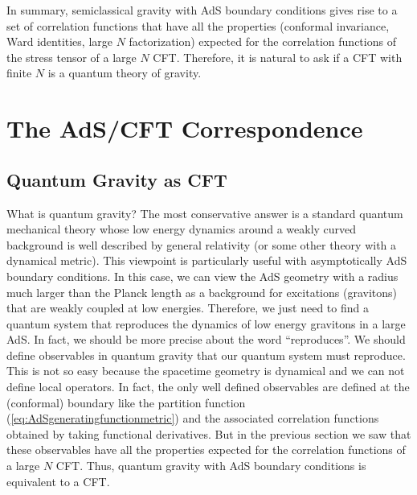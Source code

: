 \documentclass{ws-rv9x6}
\begin{document}
In summary, semiclassical gravity with AdS boundary conditions gives
rise to a set of correlation functions that have all the properties
(conformal invariance, Ward identities, large $N$ factorization)
expected for the correlation functions of the stress tensor of a large
$N$ CFT. Therefore, it is natural to ask if a CFT with finite $N$
is a quantum theory of gravity.


\section{The AdS/CFT Correspondence \label{sec:AdSCFT}}


\subsection{Quantum Gravity as CFT \label{sec:QGinAdS}}

What is quantum gravity? The most conservative answer is a standard
quantum mechanical theory whose low energy dynamics around a weakly
curved background is well described by general relativity (or some
other theory with a dynamical metric). This viewpoint is particularly
useful with asymptotically AdS boundary conditions. In this case,
we can view the AdS geometry with a radius much larger than the Planck
length as a background for excitations (gravitons) that are weakly
coupled at low energies. Therefore, we just need to find a quantum
system that reproduces the dynamics of low energy gravitons in a large
AdS. In fact, we should be more precise about the word ``reproduces''.
We should define observables in quantum gravity that our quantum system
must reproduce. This is not so easy because the spacetime geometry
is dynamical and we can not define local operators. In fact, the only
well defined observables are defined at the (conformal) boundary like
the partition function (\ref{eq:AdSgeneratingfunctionmetric}) and
the associated correlation functions obtained by taking functional
derivatives. But in the previous section we saw that these observables
have all the properties expected for the correlation functions of
a large $N$ CFT. Thus, quantum gravity with AdS boundary conditions
is equivalent to a CFT.
\end{document}
